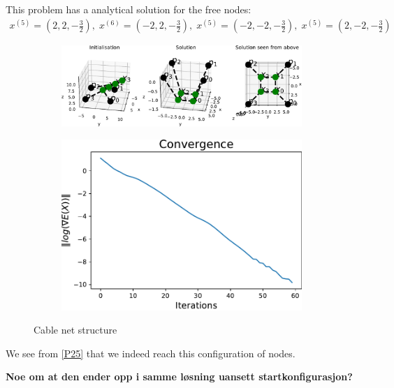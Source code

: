 This problem has a analytical solution for the free nodes:
\begin{equation*}
    \begin{gathered}
    x^{(5)} = (2,2,-\frac{3}{2}),\;x^{(6)} = (-2,2,-\frac{3}{2}),\;x^{(5)} = (-2,-2,-\frac{3}{2}),\;x^{(5)} = (2,-2,-\frac{3}{2})
    \end{gathered}
\end{equation*}


\begin{figure}[!ht]
\centering
\begin{subfigure}{.72\textwidth}
  \centering
  \includegraphics[width=0.99\linewidth]{Bilder/p25.pdf}
\end{subfigure}%
\begin{subfigure}{.3\textwidth}
  \centering
  \includegraphics[width=0.99\linewidth]{Bilder/P25conv.pdf}
  \label{fig:sub2}
\end{subfigure}
\caption{Cable net structure}
\label{P25}
\end{figure}

We see from \eqref{P25} that we indeed reach this configuration of nodes. 

\textbf{Noe om at den ender opp i samme løsning uansett startkonfigurasjon?}

